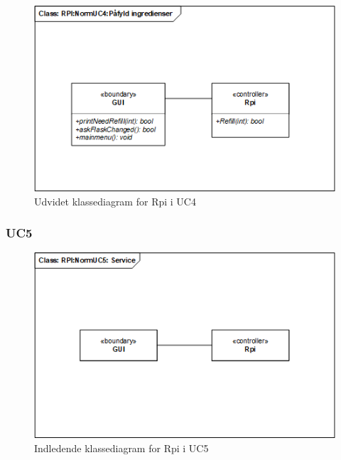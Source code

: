 \begin{figure}[H]
    \centering
    \includegraphics[width=1\textwidth]{Images/Applikationsmodeller/rpi/rpi_UdvidetklassediagramNormUC4.png}
    \caption{Udvidet klassediagram for Rpi i UC4}
    \label{fig:UcdUC4Rpi}
\end{figure}

\subsubsection{UC5}

\begin{figure}[H]
    \centering
    \includegraphics[width=1\textwidth]{Images/Applikationsmodeller/rpi/rpi_klassediagramNormUC5.png}
    \caption{Indledende klassediagram for Rpi i UC5}
    \label{fig:cdUC5Rpi}
\end{figure}

